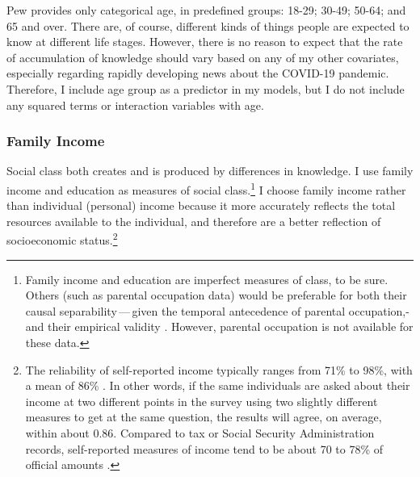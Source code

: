 \documentclass[11pt]{article}
\begin{document}
Pew provides only categorical age, in predefined groups: 18-29; 30-49; 50-64; and 65 and over. There are, of course, different kinds of things people are expected to know at different life stages. However, there is no reason to expect that the rate of accumulation of knowledge should vary based on any of my other covariates, especially regarding rapidly developing news about the COVID-19 pandemic. Therefore, I include age group as a predictor in my models, but I do not include any squared terms or interaction variables with age.




\subsubsection{Family Income}\label{sec:class-income}

Social class both creates and is produced by differences in knowledge. I use family income and education as measures of social class.\footnote
    {Family income and education are imperfect measures of class, to be sure. Others (such as parental occupation data) would be preferable for both their causal separability\,---\,given the temporal antecedence of parental occupation,\--\,and their empirical validity \citep{Weeden2005a, Weeden2012}. However, parental occupation is not available for these data.}
I choose family income rather than individual (personal) income because it more accurately reflects the total resources available to the individual, and therefore are a better reflection of socioeconomic status.\footnote
  {The reliability of self-reported income typically ranges from 71\% to 98\%, with a mean of 86\% \citep{Marquis1986}. In other words, if the same individuals are asked about their income at two different points in the survey using two slightly different measures to get at the same question, the results will agree, on average, within about 0.86. Compared to tax or Social Security Administration records, self-reported measures of income tend to be about 70  to 78\% of official amounts \citep{Coder1996, Reardon2011a}.}
  
\end{document}
